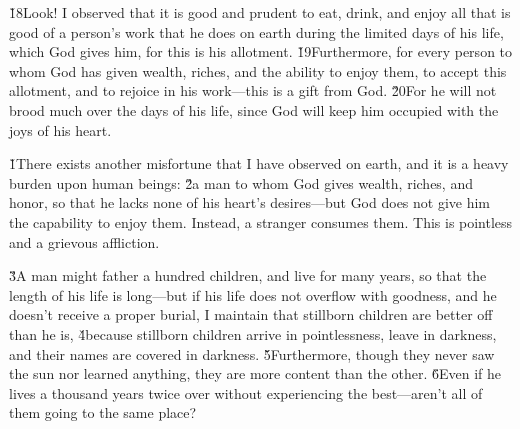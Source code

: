 \v{18}Look! I observed that it is good and prudent to eat, drink, and enjoy all that is good of a person's work that he does on earth during the limited days of his life, which God gives him, for this is his allotment. \v{19}Furthermore, for every person to whom God has given wealth, riches, and the ability to enjoy them, to accept this allotment, and to rejoice in his work---this is a gift from God. \v{20}For he will not brood much over the days of his life, since God will keep him occupied with the joys of his heart.

\v{1}There exists another misfortune that I have observed on earth, and it is a heavy burden upon human beings: \v{2}a man to whom God gives wealth, riches, and honor, so that he lacks none of his heart's desires---but God does not give him the capability to enjoy them. Instead, a stranger consumes them. This is pointless and a grievous affliction.

\v{3}A man might father a hundred children, and live for many years, so that the length of his life is long---but if his life does not overflow with goodness, and he doesn't receive a proper burial, I maintain that stillborn children are better off than he is, \v{4}because stillborn children arrive in pointlessness, leave in darkness, and their names are covered in darkness. \v{5}Furthermore, though they never saw the sun nor learned anything, they are more content than the other. \v{6}Even if he lives a thousand years twice over without experiencing the best---aren't all of them going to the same place?

